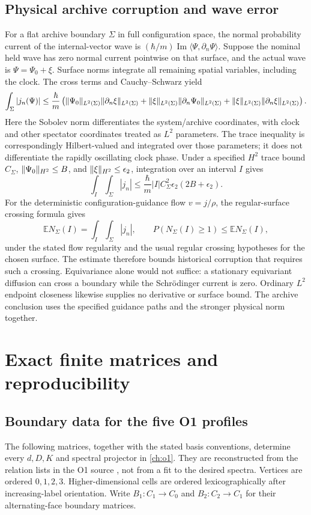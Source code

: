 \section{Physical archive corruption and wave error}\label{section:witness:physical-archive-corruption-and-wave-error}
For a flat archive boundary $\Sigma$ in full configuration space, the normal probability current of the internal-vector wave is $(\hbar/m)\operatorname{Im}\langle\Psi,\partial_n\Psi\rangle$. Suppose the nominal held wave has zero normal current pointwise on that surface, and the actual wave is $\Psi=\Psi_0+\xi$. Surface norms integrate all remaining spatial variables, including the clock. The cross terms and Cauchy--Schwarz yield
\[
\int_\Sigma |j_n(\Psi)|\le\frac{\hbar}{m}
\left(\lVert \Psi_0\rVert_{L^2(\Sigma)}\lVert \partial_n\xi\rVert_{L^2(\Sigma)}
+\lVert \xi\rVert_{L^2(\Sigma)}\lVert \partial_n\Psi_0\rVert_{L^2(\Sigma)}
+\lVert \xi\rVert_{L^2(\Sigma)}\lVert \partial_n\xi\rVert_{L^2(\Sigma)}\right).
\]
Here the Sobolev norm differentiates the system/archive coordinates, with clock and other spectator coordinates treated as $L^2$ parameters. The trace inequality is correspondingly Hilbert-valued and integrated over those parameters; it does not differentiate the rapidly oscillating clock phase. Under a specified $H^2$ trace bound $C_\Sigma$, $\lVert \Psi_0\rVert_{H^2}\le B$, and $\lVert \xi\rVert_{H^2}\le\epsilon_2$, integration over an interval $I$ gives
\[
\int_I\!\int_\Sigma |j_n|\le
\frac{\hbar}{m}|I|C_\Sigma^2\epsilon_2(2B+\epsilon_2).
\]
For the deterministic configuration-guidance flow $v=j/\rho$, the regular-surface crossing formula gives
\[
 \mathbb E N_\Sigma(I)=\int_I\!\int_\Sigma |j_n|,
 \qquad
 P(N_\Sigma(I)\ge1)\le\mathbb E N_\Sigma(I),
\]
under the stated flow regularity and the usual regular crossing hypotheses for the chosen surface. The estimate therefore bounds historical corruption that requires such a crossing. Equivariance alone would not suffice: a stationary equivariant diffusion can cross a boundary while the Schr\"odinger current is zero. Ordinary $L^2$ endpoint closeness likewise supplies no derivative or surface bound. The archive conclusion uses the specified guidance paths and the stronger physical norm together.

\chapter{Exact finite matrices and reproducibility}\label{app:matrices}
\section{Boundary data for the five O1 profiles}\label{section:matrices:boundary-data-for-the-five-o1-profiles}
The following matrices, together with the stated basis conventions, determine every $d,D,K$ and spectral projector in \cref{ch:o1}. They are reconstructed from the relation lists in the O1 source \cite{RodgersO1}, not from a fit to the desired spectra. Vertices are ordered $0,1,2,3$. Higher-dimensional cells are ordered lexicographically after increasing-label orientation. Write $B_1:C_1\to C_0$ and $B_2:C_2\to C_1$ for their alternating-face boundary matrices.

